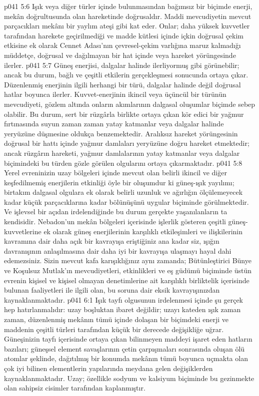 \vs p041 5:6 Işık veya diğer türler içinde bulunmasından bağımsız bir biçimde enerji, mekân doğrultusunda olan hareketinde doğrusaldır. Maddi mevcudiyetin mevcut parçacıkları mekânı bir yaylım ateşi gibi kat eder. Onlar; daha yüksek kuvvetler tarafından harekete geçirilmediği ve madde kütlesi içinde içkin doğrusal çekim etkisine ek olarak Cennet Adası’nın çevresel\hyp{}çekim varlığına maruz kalmadığı müddetçe, doğrusal ve dağılmayan bir hat içinde veya hareket yörüngesinde ilerler.
\vs p041 5:7 Güneş enerjisi, dalgalar halinde ilerliyormuş gibi görünebilir; ancak bu durum, bağlı ve çeşitli etkilerin gerçekleşmesi sonucunda ortaya çıkar. Düzenlenmiş enerjinin ilgili herhangi bir türü, dalgalar halinde değil doğrusal hatlar boyunca ilerler. Kuvvet\hyp{}enerjinin ikincil veya üçüncül bir türünün mevcudiyeti, gözlem altında onların akımlarının dalgasal oluşumlar biçimde  sebep olabilir. Bu durum, sert bir rüzgârla birlikte ortaya çıkan kör edici bir yağmur fırtınasında suyun zaman zaman yatay katmanlar veya dalgalar halinde yeryüzüne düşmesine oldukça benzemektedir. Aralıksız hareket yörüngesinin doğrusal bir hattı içinde yağmur damlaları yeryüzüne doğru hareket etmektedir; ancak rüzgârın hareketi, yağmur damlalarının yatay katmanlar veya dalgalar biçimindeki bu türden gözle görülen olgularını ortaya çıkarmaktadır.
\vs p041 5:8 Yerel evreninizin uzay bölgeleri içinde mevcut olan belirli ikincil ve diğer keşfedilmemiş enerjilerin etkinliği öyle bir oluşumdur ki güneş\hyp{}ışık yayılımı; birtakım dalgasal olgulara ek olarak belirli uzunluk ve ağırlığın ölçülemeyecek kadar küçük parçacıklarına kadar bölünüşünü uygular biçiminde görülmektedir. Ve işlevsel bir açıdan irdelendiğinde bu durum gerçekte yaşanılanların ta kendisidir. Nebadon’un mekân bölgeleri içerisinde işlerlik gösteren çeşitli güneş\hyp{}kuvvetlerine ek olarak güneş enerjilerinin karşılıklı etkileşimleri ve ilişkilerinin kavramına dair daha açık bir kavrayışa eriştiğiniz ana kadar siz, ışığın davranışının anlaşılmasına dair daha iyi bir kavrayışa ulaşmayı hayal dahi edemezsiniz. Sizin mevcut kafa karışıklığınız aynı zamanda; Bütünleştirici Bünye ve Koşulsuz Mutlak’ın mevcudiyetleri, etkinlikleri ve eş güdümü biçiminde üstün evrenin kişisel ve kişisel olmayan denetimlerine ait karşılıklı birliktelik içerisinde bulunan faaliyetleri ile ilgili olan, bu soruna dair eksik kavrayışınızdan kaynaklanmaktadır.
\vs p041 6:1 Işık tayfı olgusunun irdelenmesi içinde şu gerçek hep hatırlanmalıdır: uzay boşluktan ibaret değildir; uzayı kateden ışık zaman zaman, düzenlenmiş mekânın tümü içinde dolaşan bir biçimdeki enerji ve maddenin çeşitli türleri tarafından küçük bir derecede değişikliğe uğrar. Güneşinizin tayfı içerisinde ortaya çıkan bilinmeyen maddeyi işaret eden hatların bazıları; güneşsel element savaşlarının çetin çarpışmaları sonrasında oluşan ölü atomlar şeklinde, dağıtılmış bir konumda mekânın tümü boyunca uçmakta olan çok iyi bilinen elementlerin yapılarında meydana gelen değişiklerden kaynaklanmaktadır. Uzay; özellikle sodyum ve kalsiyum biçiminde bu gezinmekte olan sahipsiz cisimler tarafından kaplanmıştır.
